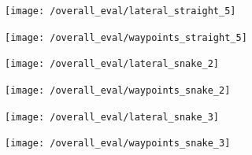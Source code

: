 \documentclass[titlepage,draft]{article}
\begin{document}
{\begin{figure}[H]
	\centering
	\begin{minipage}{.45\textwidth}
		\centering
		\texttt{[image: /overall\_eval/lateral\_straight\_5]}
		\label{fig:straight_lat_5}
	\end{minipage}%
	\hspace{0.1\textwidth}%
	\begin{minipage}{.45\textwidth}
		\centering
		\texttt{[image: /overall\_eval/waypoints\_straight\_5]}
		\label{fig:straight_way_5}
	\end{minipage}
\end{figure}









\begin{figure}[H]
	\centering
	\begin{minipage}{.45\textwidth}
		\centering
		\texttt{[image: /overall\_eval/lateral\_snake\_2]}
		\label{fig:snake_lat_2}
	\end{minipage}%
	\hspace{0.1\textwidth}%
	\begin{minipage}{.45\textwidth}
		\centering
		\texttt{[image: /overall\_eval/waypoints\_snake\_2]}
		\label{fig:snake_way_2}
	\end{minipage}
\end{figure}

\begin{figure}[H]
	\centering
	\begin{minipage}{.45\textwidth}
		\centering
		\texttt{[image: /overall\_eval/lateral\_snake\_3]}
		\label{fig:snake_lat_3}
	\end{minipage}%
	\hspace{0.1\textwidth}%
	\begin{minipage}{.45\textwidth}
		\centering
		\texttt{[image: /overall\_eval/waypoints\_snake\_3]}
		\label{fig:snake_way_3}
	\end{minipage}
\end{figure}

}
\end{document}
